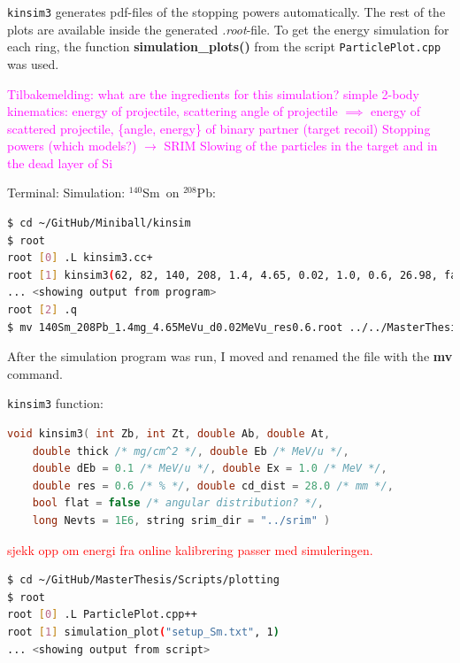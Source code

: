 \documentclass[twoside,english]{uiofysmaster/uiofysmaster}
\newcommand{\Sm}{$^{140}$Sm} %
\newcommand{\Pb}{$^{208}$Pb}
\begin{document}
\texttt{kinsim3} generates pdf-files of the stopping powers automatically. 
The rest of the plots are available inside the generated \textit{.root}-file. 
To get the energy simulation for each ring, the function \textbf{simulation\_plots()} from the script \texttt{ParticlePlot.cpp} was used. 

\textcolor{Magenta}{Tilbakemelding: \newline 
what are the ingredients for this simulation? \newline
simple 2-body kinematics: energy of projectile, scattering angle of projectile $\implies$ energy of scattered projectile, \{angle, energy\} of binary partner (target recoil) \newline
Stopping powers (which models?) $\rightarrow$ SRIM \newline
Slowing of the particles in the target and in the dead layer of Si
}

\bigskip



Terminal: Simulation: \Sm\ on \Pb:
\begin{lstlisting}[language=sh]
$ cd ~/GitHub/Miniball/kinsim
$ root
root [0] .L kinsim3.cc+
root [1] kinsim3(62, 82, 140, 208, 1.4, 4.65, 0.02, 1.0, 0.6, 26.98, false, 1e6, "../SRIM")
... <showing output from program>
root [2] .q
$ mv 140Sm_208Pb_1.4mg_4.65MeVu_d0.02MeVu_res0.6.root ../../MasterThesis/Sorted_data/sim_140Sm_208Pb.root
\end{lstlisting}

After the simulation program was run, I moved and renamed the file with the \textbf{mv} command. 





\texttt{kinsim3} function:
\begin{lstlisting}[language=c++]
void kinsim3( int Zb, int Zt, double Ab, double At, 
	double thick /* mg/cm^2 */, double Eb /* MeV/u */, 
	double dEb = 0.1 /* MeV/u */, double Ex = 1.0 /* MeV */, 
	double res = 0.6 /* % */, double cd_dist = 28.0 /* mm */, 
	bool flat = false /* angular distribution? */, 
	long Nevts = 1E6, string srim_dir = "../srim" )
\end{lstlisting}


\bigskip

\textcolor{red}{sjekk opp om energi fra online kalibrering passer med simuleringen.}




\begin{lstlisting}[language=sh]
$ cd ~/GitHub/MasterThesis/Scripts/plotting
$ root
root [0] .L ParticlePlot.cpp++
root [1] simulation_plot("setup_Sm.txt", 1)
... <showing output from script>
\end{lstlisting}
\end{document}
